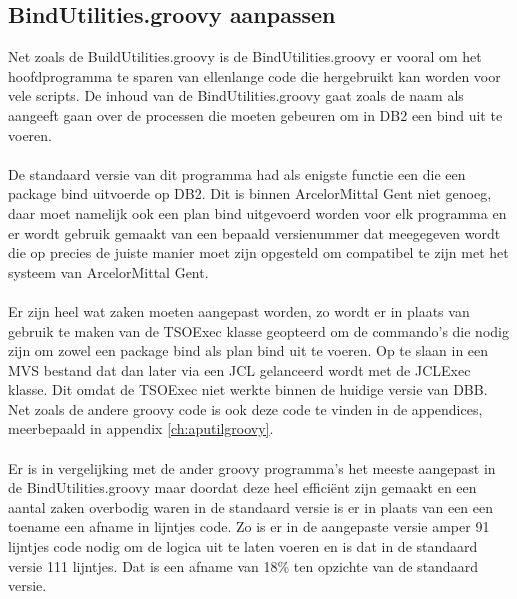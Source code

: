 \subsection{BindUtilities.groovy aanpassen}
Net zoals de BuildUtilities.groovy is de BindUtilities.groovy er vooral om het hoofdprogramma te sparen van ellenlange code die hergebruikt kan worden voor vele scripts. De inhoud van de BindUtilities.groovy gaat zoals de naam als aangeeft gaan over de processen die moeten gebeuren om in DB2 een bind uit te voeren. 
\\ \\
De standaard versie van dit programma had als enigste functie een die een package bind uitvoerde op DB2. Dit is binnen ArcelorMittal Gent niet genoeg, daar moet namelijk ook een plan bind uitgevoerd worden voor elk programma en er wordt gebruik gemaakt van een bepaald versienummer dat meegegeven wordt die op precies de juiste manier moet zijn opgesteld om compatibel te zijn met het systeem van ArcelorMittal Gent.
\\ \\
Er zijn heel wat zaken moeten aangepast worden, zo wordt er in plaats van gebruik te maken van de TSOExec klasse geopteerd om de commando's die nodig zijn om zowel een package bind als plan bind uit te voeren. Op te slaan in een MVS bestand dat dan later via een JCL gelanceerd wordt met de JCLExec klasse. Dit omdat de TSOExec niet werkte binnen de huidige versie van DBB. Net zoals de andere groovy code is ook deze code te vinden in de appendices, meerbepaald in appendix \ref{ch:aputilgroovy}. 
\\ \\
Er is in vergelijking met de ander groovy programma's het meeste aangepast in de BindUtilities.groovy maar doordat deze heel efficiënt zijn gemaakt en een aantal zaken overbodig waren in de standaard versie is er in plaats van een een toename een afname in lijntjes code. Zo is er in de aangepaste versie amper 91 lijntjes code nodig om de logica uit te laten voeren en is dat in de standaard versie 111 lijntjes. Dat is een afname van 18\% ten opzichte van de standaard versie. 

